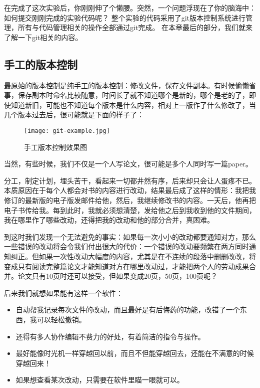 在完成了这次实验后，你刚刚伸了个懒腰。突然，一个问题浮现在了你的脑海中：如何提交刚刚完成的实验代码呢？
整个实验的代码采用了git版本控制系统进行管理，所有与代码管理相关的操作全部通过git完成。
在本章最后的部分，我们就来了解一下git相关的内容。

\subsection{手工的版本控制}

最原始的版本控制是纯手工的版本控制：修改文件，保存文件副本。有时候偷懒省事，保存副本时命名比较随意，时间长了就不知道哪个是新的，哪个是老的了，即使知道新旧，可能也不知道每个版本是什么内容，相对上一版作了什么修改了，当几个版本过去后，很可能就是下面的样子了：

\begin{figure}[htbp]
  \centering
  \texttt{[image: git-example.jpg]}
  \caption{手工版本控制效果图}\label{fig:git-example.jpg} 
\end{figure}

当然，有些时候，我们不仅是一个人写论文，很可能是多个人同时写一篇paper。

分工，制定计划，埋头苦干，看起来一切都井然有序，后来却只会让人蛋疼不已。本质原因在于每个人都会对书的内容进行改动，结果最后成了这样的情形：我把我修订的最新版的电子版发邮件给他，然后，我继续修改书的内容。一天后，他再把电子书传给我。每到此时，我就必须想清楚，发给他之后到我收到他的文件期间，我在哪里作了哪些改动，还得把我的改动和他的部分合并，真困难。

到这时我们发现一个无法避免的事实：如果每一次小小的改动都要通知对方，那么一些错误的改动将会令我们付出很大的代价：一个错误的改动要频繁在两方同时通知纠正。但如果一次性改动大幅度的内容，尤其是在不连续的段落中删删改改，将变成只有阅读完整篇论文才能知道对方在哪里改动过，才能把两个人的劳动成果合并。论文只有10页时还可以接受，但如果变成20页，50页，100页呢？

后来我们就想如果能有这样一个软件：
\begin{itemize}
\item 自动帮我记录每次文件的改动，而且最好是有后悔药的功能，改错了一个东西，我可以轻松撤销。
\item 还得有多人协作编辑不费力的好处，有着简洁的指令与操作。
\item 最好能像时光机一样穿越回以前，而且不但能穿越回去，还能在不满意的时候穿越回来！
\item 如果想查看某次改动，只需要在软件里瞄一眼就可以。
\end{itemize}


